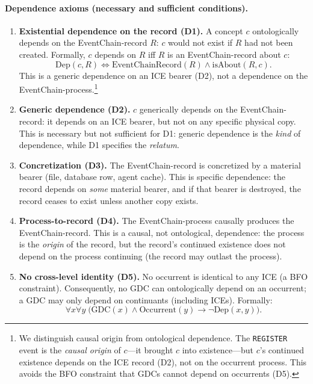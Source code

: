 \paragraph{Dependence axioms (necessary and sufficient conditions).}
\begin{enumerate}[label=Axiom D\arabic*:,leftmargin=3em]
    \item \textbf{Existential dependence on the record (D1).} A concept $c$ ontologically depends on the EventChain-record $R$: $c$ would not exist if $R$ had not been created. Formally, $c$ depends on $R$ iff $R$ is an EventChain-record about $c$:
    \begin{equation}\label{eq:d1}
        \text{Dep}(c, R) \iff \text{EventChainRecord}(R) \land \text{isAbout}(R, c).
    \end{equation}
    This is a generic dependence on an ICE bearer (D2), not a dependence on the EventChain-process.\footnote{We distinguish causal origin from ontological dependence. The \texttt{REGISTER} event is the \emph{causal origin} of $c$---it brought $c$ into existence---but $c$'s continued existence depends on the ICE record (D2), not on the occurrent process. This avoids the BFO constraint that GDCs cannot depend on occurrents (D5).}
    
    \item \textbf{Generic dependence (D2).} $c$ generically depends on the EventChain-record: it depends on an ICE bearer, but not on any specific physical copy. This is necessary but not sufficient for D1: generic dependence is the \emph{kind} of dependence, while D1 specifies the \emph{relatum}.
    
    \item \textbf{Concretization (D3).} The EventChain-record is concretized by a material bearer (file, database row, agent cache). This is specific dependence: the record depends on \emph{some} material bearer, and if that bearer is destroyed, the record ceases to exist unless another copy exists.
    
    \item \textbf{Process-to-record (D4).} The EventChain-process causally produces the EventChain-record. This is a causal, not ontological, dependence: the process is the \emph{origin} of the record, but the record's continued existence does not depend on the process continuing (the record may outlast the process).
    
    \item \textbf{No cross-level identity (D5).} No occurrent is identical to any ICE (a BFO constraint). Consequently, no GDC can ontologically depend on an occurrent; a GDC may only depend on continuants (including ICEs). Formally:
    \begin{equation}\label{eq:d5}
        \forall x \forall y\;\bigl(\text{GDC}(x) \land \text{Occurrent}(y) \rightarrow \neg\text{Dep}(x, y)\bigr).
    \end{equation}
    

\end{enumerate}
